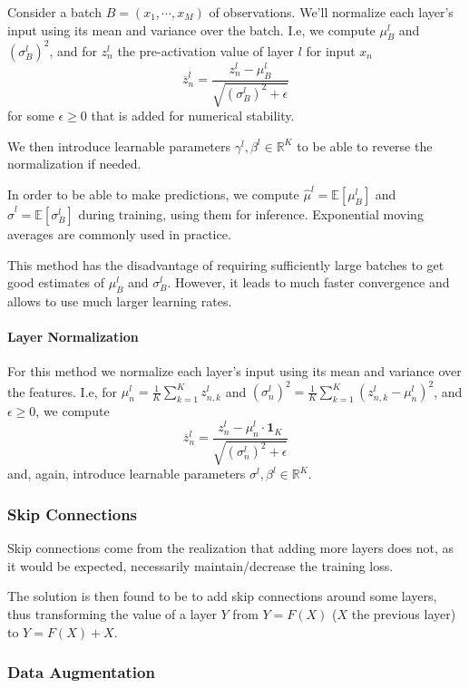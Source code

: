 \documentclass{article}
\newcommand{\R}{\mathbb{R}}
\newcommand{\E}{\mathbb{E}}
\begin{document}
Consider a batch $B = (x_1, \cdots, x_M)$ of observations.
We'll normalize each layer's input using its mean and variance over the batch.
I.e, we compute $\mu_B^l$ and $(\sigma_B^l)^2$, and for $z_n^l$ the pre-activation value of layer $l$ for input $x_n$
$$
\overline{z}_n^l = \frac{z_n^l - \mu_B^l}{\sqrt{(\sigma_B^l)^2 + \epsilon}}
$$
for some $\epsilon \geq 0$ that is added for numerical stability.

We then introduce learnable parameters $\gamma^l, \beta^l \in \R^K$ to be able to reverse the normalization if needed.

In order to be able to make predictions, we compute $\hat\mu^l = \E [ \mu_B^l]$ and $\hat\sigma^l = \E[\sigma_B^l]$ during training, using them for inference.
Exponential moving averages are commonly used in practice.

This method has the disadvantage of requiring sufficiently large batches to get good estimates of $\mu_B^l$ and $\sigma_B^l$.
However, it leads to much faster convergence and allows to use much larger learning rates.

\paragraph{Layer Normalization}

For this method we normalize each layer's input using its mean and variance over the features.
I.e, for $\mu_n^l = \frac{1}{K} \sum_{k=1}^K z_{n,k}^l$ and $(\sigma_n^l)^2 = \frac{1}{K} \sum_{k=1}^K (z_{n,k}^l - \mu_n^l)^2$, and $\epsilon \geq 0$, we compute
$$
\overline{z}_n^l = \frac{z_n^l - \mu_n^l \cdot \mathbf{1}_K}{\sqrt{(\sigma_n^l)^2 + \epsilon}}
$$
and, again, introduce learnable parameters $\sigma^l, \beta^l \in \R^K$.

\subsubsection{Skip Connections}

Skip connections come from the realization that adding more layers does not, as it would be expected, necessarily maintain/decrease the training loss.

The solution is then found to be to add skip connections around some layers, thus transforming the value of a layer $Y$ from $Y = F(X)$ ($X$ the previous layer) to $Y = F(X) + X$.

\subsubsection{Data Augmentation}
\end{document}
